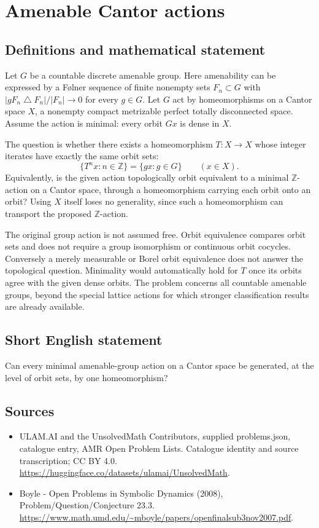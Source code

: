 \documentclass[11pt,a4paper]{article}
\begin{document}
\section*{Amenable Cantor actions}\label{statement}

\subsection{Definitions and mathematical statement}
Let $G$ be a countable discrete amenable group. Here amenability can be
expressed by a Følner sequence of finite nonempty sets $F_n\subset G$
with $|gF_n\mathbin{\triangle} F_n|/|F_n|\to0$ for every $g\in G$.
Let $G$ act by homeomorphisms on a Cantor space $X$, a nonempty compact
metrizable perfect totally disconnected space. Assume the action is
minimal: every orbit $Gx$ is dense in $X$.

The question is whether there exists a homeomorphism $T:X\to X$ whose
integer iterates have exactly the same orbit sets:
\[
 \{T^n x:n\in\mathbb Z\}=\{gx:g\in G\}
                \qquad(x\in X).
\]
Equivalently, is the given action topologically orbit equivalent to a
minimal $\mathbb Z$-action on a Cantor space, through a homeomorphism
carrying each orbit onto an orbit? Using $X$ itself loses no generality,
since such a homeomorphism can transport the proposed $\mathbb Z$-action.

The original group action is not assumed free. Orbit equivalence
compares orbit sets and does not require a group isomorphism or
continuous orbit cocycles. Conversely a merely measurable or Borel
orbit equivalence does not answer the topological question. Minimality
would automatically hold for $T$ once its orbits agree with the given
dense orbits. The problem concerns all countable amenable groups, beyond
the special lattice actions for which stronger classification results
are already available.
\subsection{Short English statement}
Can every minimal amenable-group action on a Cantor space be generated, at the level of orbit sets, by one homeomorphism?
\subsection{Sources}
\begin{itemize}
\item[S1] ULAM.AI and the UnsolvedMath Contributors, supplied problems.json, catalogue entry, AMR Open Problem Lists. Catalogue identity and source transcription; CC BY 4.0.
\url{https://huggingface.co/datasets/ulamai/UnsolvedMath}.
\item[S2] Boyle - Open Problems in Symbolic Dynamics (2008), Problem/Question/Conjecture 23.3. 
\url{https://www.math.umd.edu/~mboyle/papers/openfinalsub3nov2007.pdf}.
\end{itemize}
\end{document}
